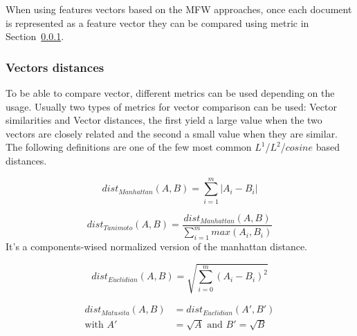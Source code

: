 When using features vectors based on the MFW approaches, once each document is represented as a feature vector they can be compared using metric in Section~\ref{sec:fv_distances}.

\subsubsection{Vectors distances}
\label{sec:fv_distances}

To be able to compare vector, different metrics can be used depending on the usage.
Usually two types of metrics for vector comparison can be used: Vector similarities and Vector distances, the first yield a large value when the two vectors are closely related and the second a small value when they are similar.
The following definitions are one of the few most common $L^1$/$L^2$/$cosine$ based distances.

\begin{definition}
  \begin{equation}
    dist_{Manhattan}(A, B) = \sum_{i=1}^{m} |A_i - B_i|
  \end{equation}
\end{definition}

\begin{definition}
  \begin{equation}
    dist_{Tanimoto}(A, B) = \frac{dist_{Manhattan}(A, B)}{\sum_{i=1}^{m} max(A_i, B_i)}
  \end{equation}
  It's a components-wised normalized version of the manhattan distance.
\end{definition}

\begin{definition}
  \begin{equation}
    dist_{Euclidian}(A, B) = \sqrt{\sum_{i=0}^{m}(A_i - B_i)^2}
  \end{equation}
\end{definition}

\begin{definition}
  \begin{equation}
    \begin{split}
      dist_{Matusita}(A, B) &= dist_{Euclidian}(A', B') \\
      \text{with }A' &= \sqrt{A}\text{ and }B' = \sqrt{B}
    \end{split}
  \end{equation}
\end{definition}

